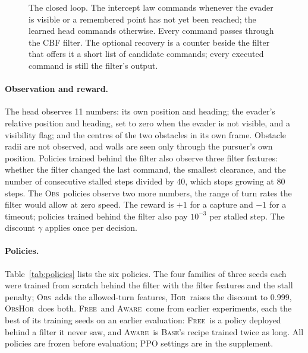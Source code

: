 \documentclass{l4dc2027}
\newcommand{\Base}{\textsc{Base}}
\newcommand{\Obs}{\textsc{Obs}}
\newcommand{\Hor}{\textsc{Hor}}
\newcommand{\ObsHor}{\textsc{ObsHor}}
\newcommand{\Free}{\textsc{Free}}
\newcommand{\Aware}{\textsc{Aware}}
\begin{document}
\begin{figure}[t]
\centering
\resizebox{0.74\linewidth}{!}{}
\caption{The closed loop. The intercept law commands whenever the evader is visible or a remembered point has not yet been reached; the learned head commands otherwise. Every command passes through the CBF filter. The optional recovery is a counter beside the filter that offers it a short list of candidate commands; every executed command is still the filter's output.}
\label{fig:loop}
\end{figure}

\paragraph{Observation and reward.} The head observes 11 numbers: its own position and heading; the evader's relative position and heading, set to zero when the evader is not visible, and a visibility flag; and the centres of the two obstacles in its own frame. Obstacle radii are not observed, and walls are seen only through the pursuer's own position. Policies trained behind the filter also observe three filter features: whether the filter changed the last command, the smallest clearance, and the number of consecutive stalled steps divided by 40, which stops growing at 80 steps. The \Obs\ policies observe two more numbers, the range of turn rates the filter would allow at zero speed. The reward is $+1$ for a capture and $-1$ for a timeout; policies trained behind the filter also pay $10^{-3}$ per stalled step. The discount $\gamma$ applies once per decision.

\paragraph{Policies.} Table~\ref{tab:policies} lists the six policies. The four families of three seeds each were trained from scratch behind the filter with the filter features and the stall penalty; \Obs\ adds the allowed-turn features, \Hor\ raises the discount to 0.999, \ObsHor\ does both. \Free\ and \Aware\ come from earlier experiments, each the best of its training seeds on an earlier evaluation: \Free\ is a policy deployed behind a filter it never saw, and \Aware\ is \Base's recipe trained twice as long. All policies are frozen before evaluation; PPO settings are in the supplement.
\end{document}
